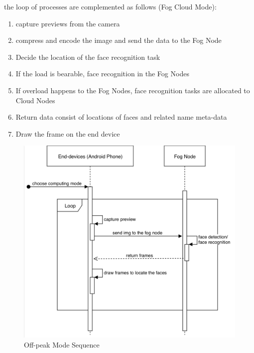 the loop of processes are complemented as follows (Fog Cloud Mode):
\begin{enumerate}
    \item capture previews from the camera
    \item compress and encode the image and send the data to the Fog Node
    \item Decide the location of the face recognition task
    \item If  the load is bearable, face recognition in the Fog Nodes
    \item If overload happens to the Fog Nodes, face recognition tasks are allocated to Cloud Nodes
    \item Return data consist of locations of faces and related name meta-data
    \item Draw the frame on the end device
\end{enumerate}

\begin{figure}
    \centering
    \includegraphics[width=\textwidth]{images/fog_mode.png}
    \caption{Off-peak Mode Sequence}
    \label{fig:off-peak_mode_sequence}
\end{figure}

